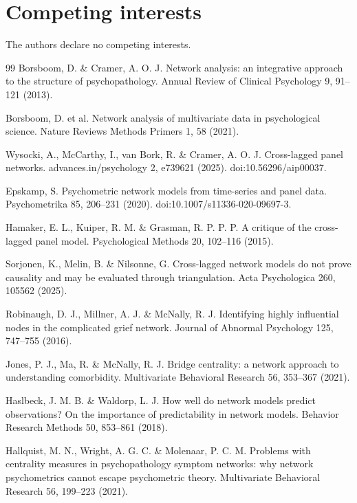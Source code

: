 \documentclass[11pt]{article}
\begin{document}
\section*{Competing interests}\label{competing-interests}

The authors declare no competing interests.

\begin{thebibliography}{99}
 Borsboom, D. \& Cramer, A. O. J. Network analysis: an integrative
approach to the structure of psychopathology. Annual Review of Clinical
Psychology 9, 91--121 (2013).

 Borsboom, D. et al. Network analysis of multivariate data in
psychological science. Nature Reviews Methods Primers 1, 58 (2021).

 Wysocki, A., McCarthy, I., van Bork, R. \& Cramer, A. O. J.
Cross-lagged panel networks. advances.in/psychology 2, e739621 (2025).
doi:10.56296/aip00037.

 Epskamp, S. Psychometric network models from time-series and panel
data. Psychometrika 85, 206--231 (2020). doi:10.1007/s11336-020-09697-3.

 Hamaker, E. L., Kuiper, R. M. \& Grasman, R. P. P. P. A critique of
the cross-lagged panel model. Psychological Methods 20, 102--116 (2015).

 Sorjonen, K., Melin, B. \& Nilsonne, G. Cross-lagged network models
do not prove causality and may be evaluated through triangulation. Acta
Psychologica 260, 105562 (2025).

 Robinaugh, D. J., Millner, A. J. \& McNally, R. J. Identifying highly
influential nodes in the complicated grief network. Journal of Abnormal
Psychology 125, 747--755 (2016).

 Jones, P. J., Ma, R. \& McNally, R. J. Bridge centrality: a network
approach to understanding comorbidity. Multivariate Behavioral Research
56, 353--367 (2021).

 Haslbeck, J. M. B. \& Waldorp, L. J. How well do network models
predict observations? On the importance of predictability in network
models. Behavior Research Methods 50, 853--861 (2018).

 Hallquist, M. N., Wright, A. G. C. \& Molenaar, P. C. M. Problems
with centrality measures in psychopathology symptom networks: why
network psychometrics cannot escape psychometric theory. Multivariate
Behavioral Research 56, 199--223 (2021).


\end{thebibliography}
\end{document}
